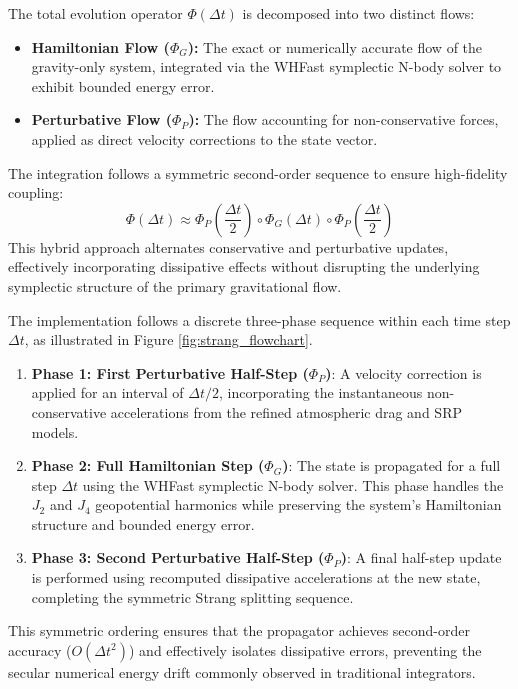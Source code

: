 \documentclass[letterpaper,11pt]{AAS}
\begin{document}
The total evolution operator $\Phi(\Delta t)$ is decomposed into two distinct flows:
\begin{itemize}
    \item \textbf{Hamiltonian Flow ($\Phi_G$):} The exact or numerically accurate flow of the gravity-only system, integrated via the WHFast symplectic N-body solver to exhibit bounded energy error.
    \item \textbf{Perturbative Flow ($\Phi_P$):} The flow accounting for non-conservative forces, applied as direct velocity corrections to the state vector.
\end{itemize}

The integration follows a symmetric second-order sequence to ensure high-fidelity coupling:
\begin{equation}
    \Phi(\Delta t) \approx \Phi_{P}\left(\frac{\Delta t}{2}\right) \circ \Phi_{G}(\Delta t) \circ \Phi_{P}\left(\frac{\Delta t}{2}\right)
\end{equation}
This hybrid approach alternates conservative and perturbative updates, effectively incorporating dissipative effects without disrupting the underlying symplectic structure of the primary gravitational flow.

The implementation follows a discrete three-phase sequence within each time step $\Delta t$, as illustrated in Figure \ref{fig:strang_flowchart}. 
\begin{enumerate}
    \item \textbf{Phase 1: First Perturbative Half-Step ($\Phi_P$)}: A velocity correction is applied for an interval of $\Delta t/2$, incorporating the instantaneous non-conservative accelerations from the refined atmospheric drag and SRP models.
    \item \textbf{Phase 2: Full Hamiltonian Step ($\Phi_G$)}: The state is propagated for a full step $\Delta t$ using the WHFast symplectic N-body solver. This phase handles the $J_2$ and $J_4$ geopotential harmonics while preserving the system's Hamiltonian structure and bounded energy error.
    \item \textbf{Phase 3: Second Perturbative Half-Step ($\Phi_P$)}: A final half-step update is performed using recomputed dissipative accelerations at the new state, completing the symmetric Strang splitting sequence.
\end{enumerate}
This symmetric ordering ensures that the propagator achieves second-order accuracy ($O(\Delta t^2)$) and effectively isolates dissipative errors, preventing the secular numerical energy drift commonly observed in traditional integrators\cite{tamayo_reboundx_2020}.
\end{document}
